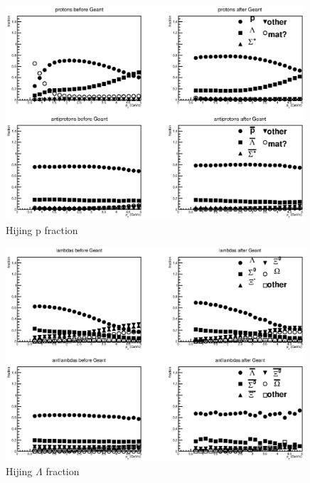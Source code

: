 \documentclass[ALICE,manyauthors]{ALICE_analysis_notes}
\begin{document}
 \begin{figure}[h!]
   \centering
   \includegraphics[width=0.99\textwidth]{pics/protonOrigin}
   \caption{Hijing p fraction}
   \label{fig:ProtonFraction}
 \end{figure}

 \begin{figure}[h!]
   \centering
   \includegraphics[width=0.99\textwidth]{pics/lambdaOrigin}
   \caption{Hijing $\Lambda$ fraction}
   \label{fig:LambdaFraction}
 \end{figure}
\end{document}
